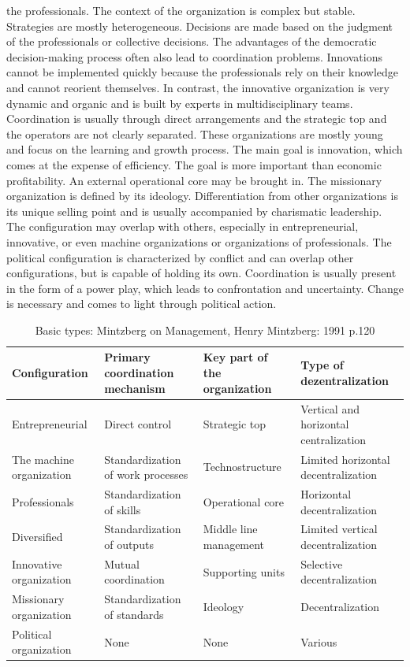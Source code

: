 \documentclass[a4paper,12pt]{article}
\begin{document}
the professionals. The context of the organization is complex but
stable. Strategies are mostly heterogeneous. Decisions are made based on the
judgment of the professionals or collective decisions. The advantages of the
democratic decision-making process often also lead to coordination
problems. Innovations cannot be implemented quickly because the professionals
rely on their knowledge and cannot reorient themselves. In contrast, the
innovative organization is very dynamic and organic and is built by experts in
multidisciplinary teams. Coordination is usually through direct arrangements
and the strategic top and the operators are not clearly separated. These
organizations are mostly young and focus on the learning and growth
process. The main goal is innovation, which comes at the expense of
efficiency. The goal is more important than economic profitability. An
external operational core may be brought in. The missionary organization is
defined by its ideology. Differentiation from other organizations is its
unique selling point and is usually accompanied by charismatic leadership. The
configuration may overlap with others, especially in entrepreneurial,
innovative, or even machine organizations or organizations of
professionals. The political configuration is characterized by conflict and
can overlap other configurations, but is capable of holding its
own. Coordination is usually present in the form of a power play, which leads
to confrontation and uncertainty. Change is necessary and comes to light
through political action.

\begin{table}[ht]
\begin{tabular}{| p{3cm} | p{3.8cm} | p{3.8cm} | p{3.8cm} |}
\hline Configuration & Primary coordination mechanism & Key part of the
organization & Type of dezentralization \\ \hline \hline Entrepreneurial &
Direct control & Strategic top & Vertical and horizontal
centralization\\ \hline The machine organization & Standardization of work
processes & Technostructure & Limited horizontal decentralization \\ \hline
Professionals & Standardization of skills & Operational core & Horizontal
decentralization\\ \hline Diversified & Standardization of outputs & Middle
line management & Limited vertical decentralization\\ \hline Innovative
organization & Mutual coordination & Supporting units & Selective
decentralization\\ \hline Missionary organization & Standardization of
standards & Ideology & Decentralization\\ \hline Political organization & None
& None & Various\\ \hline
\end{tabular}
\caption{Basic types: Mintzberg on Management, Henry Mintzberg: 1991 p.120}
\label{Tab:types}
\end{table}
\end{document}
